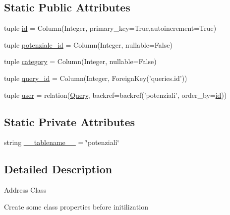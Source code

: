 \subsection*{Static Public Attributes}
\begin{DoxyCompactItemize}
\item 
tuple \hyperlink{classmmasgis_1_1sqlAlchemyQueryClass_1_1Potenziale_aac8310bcdcac4eb583c609ae8305b318}{id} = Column(Integer, primary\_\-key=True,autoincrement=True)
\item 
tuple \hyperlink{classmmasgis_1_1sqlAlchemyQueryClass_1_1Potenziale_a65403fffb80e66c2b898feeac29fdc05}{potenziale\_\-id} = Column(Integer, nullable=False)
\item 
tuple \hyperlink{classmmasgis_1_1sqlAlchemyQueryClass_1_1Potenziale_a9e0dd97ccae5fa347bff42a6faea0f2f}{category} = Column(Integer, nullable=False)
\item 
tuple \hyperlink{classmmasgis_1_1sqlAlchemyQueryClass_1_1Potenziale_a8c0ca5d07c20cec3a56d93957ba7e916}{query\_\-id} = Column(Integer, ForeignKey('queries.id'))
\item 
tuple \hyperlink{classmmasgis_1_1sqlAlchemyQueryClass_1_1Potenziale_a2761c76b2569922e0449a35cce40f1b7}{user} = relation(\hyperlink{classmmasgis_1_1sqlAlchemyQueryClass_1_1Query}{Query}, backref=backref('potenziali', order\_\-by=\hyperlink{classmmasgis_1_1sqlAlchemyQueryClass_1_1Potenziale_aac8310bcdcac4eb583c609ae8305b318}{id}))
\end{DoxyCompactItemize}
\subsection*{Static Private Attributes}
\begin{DoxyCompactItemize}
\item 
string \hyperlink{classmmasgis_1_1sqlAlchemyQueryClass_1_1Potenziale_ae917bcaa532cb8d31675f94f3dfb86e4}{\_\-\_\-tablename\_\-\_\-} = \char`\"{}potenziali\char`\"{}
\end{DoxyCompactItemize}


\subsection{Detailed Description}
\begin{DoxyVerb}
Address Class
 
Create some class properties before initilization
\end{DoxyVerb}
 

